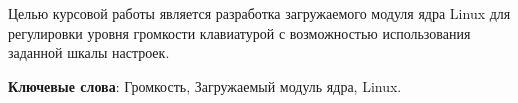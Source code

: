 \begin{essay}{}
    Целью курсовой работы является разработка загружаемого модуля ядра Linux для регулировки уровня громкости клавиатурой с возможностью использования заданной шкалы настроек.
    
    \noindent\textbf{Ключевые слова}: Громкость, Загружаемый модуль ядра, Linux.\\

\end{essay}